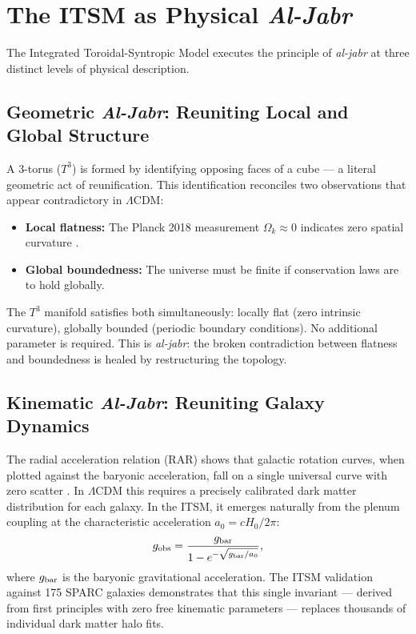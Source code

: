 \documentclass[aps,prd,11pt,onecolumn,superscriptaddress,nofootinbib,floatfix]{revtex4-2}
\begin{document}
\section{The ITSM as Physical \textit{Al-Jabr}}
\label{sec:itsm-aljabr}

The Integrated Toroidal-Syntropic Model \cite{itsm_main} executes the principle of \textit{al-jabr} at three distinct levels of physical description.

\subsection{Geometric \textit{Al-Jabr}: Reuniting Local and Global Structure}

A 3-torus ($T^3$) is formed by identifying opposing faces of a cube --- a literal geometric act of reunification. This identification reconciles two observations that appear contradictory in $\Lambda$CDM:
\begin{itemize}
    \item \textbf{Local flatness:} The Planck 2018 measurement $\Omega_k \approx 0$ indicates zero spatial curvature \cite{planck_2018}.
    \item \textbf{Global boundedness:} The universe must be finite if conservation laws are to hold globally.
\end{itemize}
The $T^3$ manifold satisfies both simultaneously: locally flat (zero intrinsic curvature), globally bounded (periodic boundary conditions). No additional parameter is required. This is \textit{al-jabr}: the broken contradiction between flatness and boundedness is healed by restructuring the topology.

\subsection{Kinematic \textit{Al-Jabr}: Reuniting Galaxy Dynamics}

The radial acceleration relation (RAR) shows that galactic rotation curves, when plotted against the baryonic acceleration, fall on a single universal curve with zero scatter \cite{mcgaugh_2016}. In $\Lambda$CDM this requires a precisely calibrated dark matter distribution for each galaxy. In the ITSM, it emerges naturally from the plenum coupling at the characteristic acceleration $a_0 = cH_0/2\pi$:
\begin{equation}
    g_{\rm obs} = \frac{g_{\rm bar}}{1 - e^{-\sqrt{g_{\rm bar}/a_0}}},
\end{equation}
where $g_{\rm bar}$ is the baryonic gravitational acceleration. The ITSM validation against 175 SPARC galaxies \cite{itsm_main, sparc_2016} demonstrates that this single invariant --- derived from first principles with zero free kinematic parameters --- replaces thousands of individual dark matter halo fits.
\end{document}

